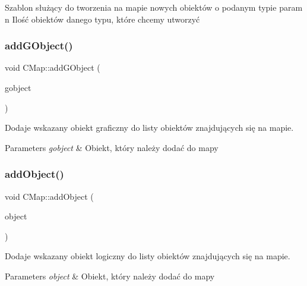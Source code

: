Szablon służący do tworzenia na mapie nowych obiektów o podanym typie param n Ilość obiektów danego typu, które chcemy utworzyć 

\mbox{\label{class_c_map_adfb0980e5f2153cd6b287a010795c6b4}} 
\subsubsection{\texorpdfstring{add\+G\+Object()}{addGObject()}}
{\footnotesize\ttfamily void C\+Map\+::add\+G\+Object (\begin{DoxyParamCaption}\item[{\mbox{\hyperlink{class_c_g_object}{C\+G\+Object}} $\ast$}]{gobject }\end{DoxyParamCaption})}



Dodaje wskazany obiekt graficzny do listy obiektów znajdujących się na mapie. 


\begin{DoxyParams}{Parameters}
{\em gobject} & Obiekt, który należy dodać do mapy \\
\hline
\end{DoxyParams}
\mbox{\label{class_c_map_a4b22b964e9d16e428c0a56b15b235c82}} 
\subsubsection{\texorpdfstring{add\+Object()}{addObject()}}
{\footnotesize\ttfamily void C\+Map\+::add\+Object (\begin{DoxyParamCaption}\item[{\mbox{\hyperlink{class_c_object}{C\+Object}} $\ast$}]{object }\end{DoxyParamCaption})}



Dodaje wskazany obiekt logiczny do listy obiektów znajdujących się na mapie. 


\begin{DoxyParams}{Parameters}
{\em object} & Obiekt, który należy dodać do mapy \\
\hline
\end{DoxyParams}
\mbox{\label{class_c_map_a55bccb7dd240a21de6e5d12df054d0cb}} 
